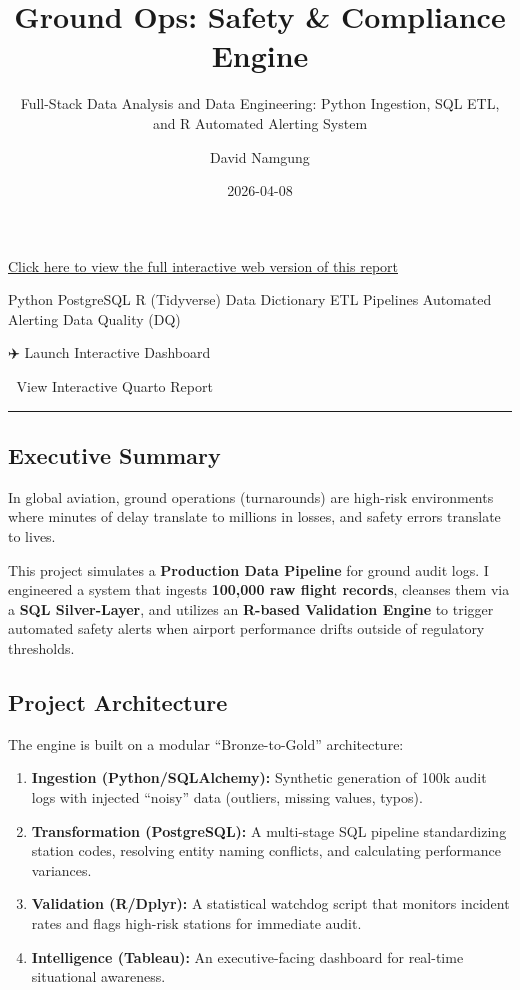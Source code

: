 \documentclass[
  letterpaper,
  DIV=11,
  numbers=noendperiod]{scrartcl}
\title{Ground Ops: Safety \& Compliance Engine}
\subtitle{Full-Stack Data Analysis and Data Engineering: Python
Ingestion, SQL ETL, and R Automated Alerting System}
\author{David Namgung}
\date{2026-04-08}
\providecommand{\tightlist}{%
  \setlength{\itemsep}{0pt}\setlength{\parskip}{0pt}}
\renewcommand*\contentsname{Table of contents}
\newcommand\contentsname{Table of contents}
\begin{document}
\maketitle

\renewcommand*\contentsname{Table of contents}
{
\hypersetup{linkcolor=}
\setcounter{tocdepth}{3}
\tableofcontents
}

\href{https://davidnamgung.github.io/safety-ground-ops-audit-engine/report/index.html}{Click
here to view the full interactive web version of this report}

{Python} {PostgreSQL} {R (Tidyverse)} {Data Dictionary} {ETL Pipelines}
{Automated Alerting} {Data Quality (DQ)}

✈️ Launch Interactive Dashboard

📄 View Interactive Quarto Report

\begin{center}\rule{0.5\linewidth}{0.5pt}\end{center}

\subsection{Executive Summary}\label{executive-summary}

In global aviation, ground operations (turnarounds) are high-risk
environments where minutes of delay translate to millions in losses, and
safety errors translate to lives.

This project simulates a \textbf{Production Data Pipeline} for ground
audit logs. I engineered a system that ingests \textbf{100,000 raw
flight records}, cleanses them via a \textbf{SQL Silver-Layer}, and
utilizes an \textbf{R-based Validation Engine} to trigger automated
safety alerts when airport performance drifts outside of regulatory
thresholds.

\subsection{Project Architecture}\label{project-architecture}

The engine is built on a modular ``Bronze-to-Gold'' architecture:

\begin{enumerate}
\def\labelenumi{\arabic{enumi}.}
\tightlist
\item
  \textbf{Ingestion (Python/SQLAlchemy):} Synthetic generation of 100k
  audit logs with injected ``noisy'' data (outliers, missing values,
  typos).
\item
  \textbf{Transformation (PostgreSQL):} A multi-stage SQL pipeline
  standardizing station codes, resolving entity naming conflicts, and
  calculating performance variances.
\item
  \textbf{Validation (R/Dplyr):} A statistical watchdog script that
  monitors incident rates and flags high-risk stations for immediate
  audit.
\item
  \textbf{Intelligence (Tableau):} An executive-facing dashboard for
  real-time situational awareness.
\end{enumerate}
\end{document}
